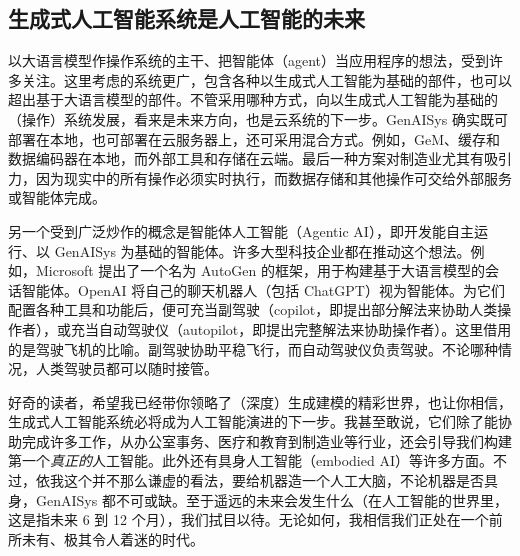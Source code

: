 \subsection{生成式人工智能系统是人工智能的未来}
以大语言模型作操作系统的主干、把智能体（agent）当应用程序的想法，受到许多关注。这里考虑的系统更广，包含各种以生成式人工智能为基础的部件，也可以超出基于大语言模型的部件。不管采用哪种方式，向以生成式人工智能为基础的（操作）系统发展，看来是未来方向，也是云系统的下一步。GenAISys 确实既可部署在本地，也可部署在云服务器上，还可采用混合方式。例如，GeM、缓存和数据编码器在本地，而外部工具和存储在云端。最后一种方案对制造业尤其有吸引力，因为现实中的所有操作必须实时执行，而数据存储和其他操作可交给外部服务或智能体完成。

另一个受到广泛炒作的概念是智能体人工智能（Agentic AI），即开发能自主运行、以 GenAISys 为基础的智能体。许多大型科技企业都在推动这个想法。例如，Microsoft 提出了一个名为 AutoGen 的框架，用于构建基于大语言模型的会话智能体。OpenAI 将自己的聊天机器人（包括 ChatGPT）视为智能体。为它们配置各种工具和功能后，便可充当副驾驶（copilot，即提出部分解法来协助人类操作者），或充当自动驾驶仪（autopilot，即提出完整解法来协助操作者）。这里借用的是驾驶飞机的比喻。副驾驶协助平稳飞行，而自动驾驶仪负责驾驶。不论哪种情况，人类驾驶员都可以随时接管。

好奇的读者，希望我已经带你领略了（深度）生成建模的精彩世界，也让你相信，生成式人工智能系统必将成为人工智能演进的下一步。我甚至敢说，它们除了能协助完成许多工作，从办公室事务、医疗和教育到制造业等行业，还会引导我们构建第一个\emph{真正的}人工智能。此外还有具身人工智能（embodied AI）等许多方面。不过，依我这个并不那么谦虚的看法，要给机器造一个人工大脑，不论机器是否具身，GenAISys 都不可或缺。至于遥远的未来会发生什么（在人工智能的世界里，这是指未来 6 到 12 个月），我们拭目以待。无论如何，我相信我们正处在一个前所未有、极其令人着迷的时代。


